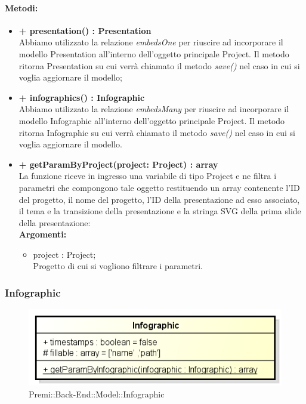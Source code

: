 	\paragraph{Metodi:}
	\begin{itemize}
		\item \textbf{+ presentation() : Presentation}\\
		Abbiamo utilizzato la relazione \textit{embedsOne} per riuscire ad incorporare il modello Presentation all'interno dell'oggetto principale Project. Il metodo ritorna Presentation su cui verrà chiamato il metodo \textit{save()} nel caso in cui si voglia aggiornare il modello;
		\item \textbf{+ infographics() : Infographic}\\
		Abbiamo utilizzato la relazione \textit{embedsMany} per riuscire ad incorporare il modello Infographic all'interno dell'oggetto principale Project. Il metodo ritorna Infographic su cui verrà chiamato il metodo \textit{save()} nel caso in cui si voglia aggiornare il modello.
		\item \textbf{+ getParamByProject(project: Project) : array}\\
		La funzione riceve in ingresso una variabile di tipo Project e ne filtra i parametri che compongono tale oggetto restituendo un array contenente l'ID del progetto, il nome del progetto, l'ID della presentazione ad esso associato, il tema e la transizione della presentazione e la stringa SVG della prima slide della presentazione:\\
		\textbf{Argomenti:}
		\begin{itemize}
			\item project : Project;\\
			Progetto di cui si vogliono filtrare i parametri.
		\end{itemize}
	\end{itemize}

\newpage
\subsubsection{Infographic}

	\begin{figure}[h]
		\centering
		\includegraphics[width=0.5\linewidth]{img/back_end_premi_model_infographic}
		\caption[Premi::Back-End::Model::Infographic]{Premi::Back-End::Model::Infographic}
		\label{fig:back_end_premi_model_infographic}
	\end{figure}



